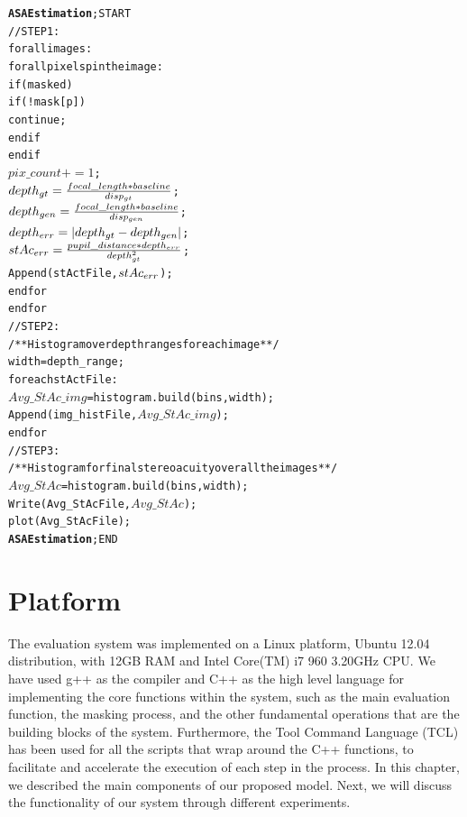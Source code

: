 \begin{alltt}
\textbf{ASA Estimation}; START
   // STEP1:
   for all images:
      for all pixels p in the image:
            if (masked)
               if(!mask[p]) 
                  continue;
               end if
            end if    
            \(pix\_count += 1\);
            \(depth\sb{gt} = \frac{focal\_length * baseline}{disp\sb{gt}}\);
            \(depth\sb{gen} = \frac{focal\_length * baseline}{disp\sb{gen}}\);
            \(depth\sb{err} = |depth\sb{gt}-depth\sb{gen}|\);
            \(stAc\sb{err} = \frac{pupil\_distance*depth\sb{err}}{depth\sb{gt}\sp{2}}\);
            Append(stActFile,\(stAc\sb{err}\));
      end for
   end for
   // STEP2:
   /**Histogram over depth ranges for each image**/
   width = depth\_range;
   for each stActFile:
      \(Avg\_StAc\_img\) = histogram.build(bins,width);
      Append(img\_histFile,\(Avg\_StAc\_img\));
   end for
   // STEP3:
   /**Histogram for final stereoacuity over all the images**/
   \(Avg\_StAc\) = histogram.build(bins,width);
   Write(Avg\_StAcFile,\(Avg\_StAc\));
   plot(Avg\_StAcFile);
\textbf{ASA Estimation}; END
\end{alltt}

\section{Platform}
The evaluation system was implemented on a Linux platform, Ubuntu 12.04 distribution, with 12GB RAM and Intel Core(TM) i7 960 3.20GHz CPU. 
We have used g++ as the compiler and C++ as the high level language for implementing 
the core functions within the system, such as the main evaluation function, 
the masking process, and the other fundamental operations that are the building blocks of the system.
Furthermore, the Tool Command Language (TCL) has been used for all the scripts that wrap around the C++ functions,
to facilitate and accelerate the execution of each step in the process. \newline \newline
In this chapter, we described the main components of our proposed model. Next, we will discuss the functionality of our system through different experiments.
